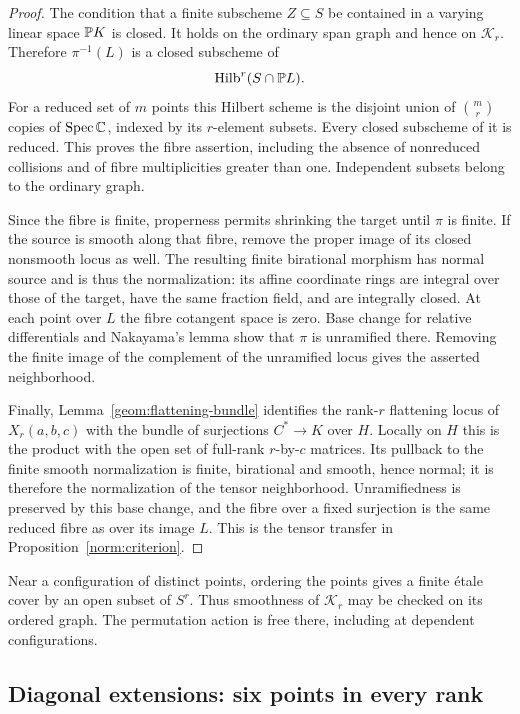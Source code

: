 \begin{proof}
The condition that a finite subscheme $Z\subseteq S$ be contained in
a varying linear space $\mathbb P K$ is closed. It holds on the ordinary
span graph and hence on $\mathcal K_r$. Therefore $\pi^{-1}(L)$ is
a closed subscheme of
\[
 \operatorname{Hilb}^r(S\cap\mathbb P L).
\]
For a reduced set of $m$ points this Hilbert scheme is the disjoint
union of $\binom mr$ copies of $\operatorname{Spec}\mathbb C$, indexed by its
$r$-element subsets. Every closed subscheme of it is reduced. This
proves the fibre assertion, including the absence of nonreduced
collisions and of fibre multiplicities greater than one. Independent
subsets belong to the ordinary graph.

Since the fibre is finite, properness permits shrinking the target
until $\pi$ is finite. If the source is smooth along that fibre,
remove the proper image of its closed nonsmooth locus as well. The
resulting finite birational morphism has normal source and is thus the
normalization: its affine coordinate rings are integral over those of
the target, have the same fraction field, and are integrally closed.
At each point over $L$ the fibre cotangent space is zero. Base change
for relative differentials and Nakayama's lemma show that $\pi$ is
unramified there. Removing the finite image of the complement of the
unramified locus gives the asserted neighborhood.

Finally, Lemma~\ref{geom:flattening-bundle} identifies the rank-$r$
flattening locus of $X_r(a,b,c)$ with the bundle of surjections
$C^*\to K$ over $H$. Locally on $H$ this is the product with the
open set of full-rank $r$-by-$c$ matrices. Its pullback to the finite
smooth normalization is finite, birational and smooth, hence normal;
it is therefore the normalization of the tensor neighborhood.
Unramifiedness is preserved by this base change, and the fibre over a
fixed surjection is the same reduced fibre as over its image $L$.
This is the tensor transfer in Proposition~\ref{norm:criterion}.
\end{proof}

Near a configuration of distinct points, ordering the points gives a
finite \'etale cover by an open subset of $S^r$. Thus smoothness of
$\mathcal K_r$ may be checked on its ordered graph. The permutation
action is free there, including at dependent configurations.

\subsection{Diagonal extensions: six points in every rank}
\label{nf:diagonal-subsection}

